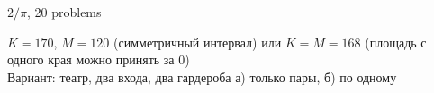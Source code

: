 \begin{solution}{11.9}
  $2/\pi$, 20 problems
\end{solution}
\begin{solution}{12.1}
\end{solution}
\begin{solution}{12.2}
\end{solution}
\begin{solution}{12.3}
\end{solution}
\begin{solution}{12.4}
\end{solution}
\begin{solution}{12.5}
\end{solution}
\begin{solution}{12.6}
\end{solution}
\begin{solution}{12.7}
\end{solution}
\begin{solution}{12.8}
\end{solution}
\begin{solution}{12.9}
\end{solution}
\begin{solution}{12.10}
\end{solution}
\begin{solution}{12.11}
\end{solution}
\begin{solution}{12.12}
\end{solution}
\begin{solution}{12.13}
\end{solution}
\begin{solution}{12.14}
\end{solution}
\begin{solution}{12.15}
\end{solution}
\begin{solution}{12.16}
\end{solution}
\begin{solution}{12.17}
\end{solution}
\begin{solution}{13.1}
\end{solution}
\begin{solution}{13.2}
\end{solution}
\begin{solution}{13.3}
  $K=170$, $M=120$ (симметричный интервал) или $K=M=168$ (площадь с одного края можно принять за 0) \\
  Вариант: театр, два входа, два гардероба а) только пары, б) по одному
\end{solution}
